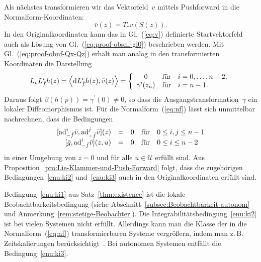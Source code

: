 \begin{svmultproof2}
Als nächstes transformieren wir das Vektorfeld~$v$ mittels Pushforward
in die Normalform-Koordinaten: 
\[
\bar{v}(z)=T_{*}v(S(z)).
\]
In den Originalkoordinaten kann das in Gl.~(\ref{eq:v}) definierte
Startvektorfeld auch als Lösung von Gl.~(\ref{eq:proof-obsnf-gl0})
beschrieben werden. Mit Gl.~(\ref{eq:proof-obnf-Qx-Qz}) erhält man
analog in den transformierten Koordinaten die Darstellung 
\[
L_{\bar{v}}L_{\bar{f}}^{i}\bar{h}(z)=\left\langle {\mathrm{d}} L_{\bar{f}}^{i}\bar{h}(z),\bar{v}(z)\right\rangle =\left\{ \begin{array}{ccl}
0 & \mbox{für} & i=0,\ldots,n-2,\\
\gamma^{\prime}(z_{n}) & \mbox{für} & i=n-1.
\end{array}\right.
\]
Daraus folgt $\beta(h(p))=\gamma^{\prime}(0)\neq0$, so dass die Ausgangstransformation~$\gamma$
ein lokaler Diffeomorphismus ist. Für die Normalform~(\ref{eq:nf})
lässt sich unmittelbar nachrechnen, dass die Bedingungen 
\[
\begin{array}{rclcl}
[{\operatorname{ad}}_{-\bar{f}}^{i}\bar{v},{\operatorname{ad}}_{-\bar{f}}^{j}\bar{v}](z) & = & 0 & \mbox{für} & 0\leq i,j\leq n-1\\{}
[\bar{g},{\operatorname{ad}}_{-\bar{f}}^{i}\bar{v}](z,u) & = & 0 & \mbox{für} & 0\leq i\leq n-2
\end{array}
\]
in einer Umgebung von $z=0$ und für alle $u\in\mathcal{U}$ erfüllt
sind. Aus Proposition~\ref{pro:Lie-Klammer-und-Push-Forward} folgt,
dass die zugehörigen Bedingungen~\ref{enu:ki2} und~\ref{enu:ki3}
auch in den Originalkoordinaten erfüllt sind.
\end{svmultproof2}

Bedingung~\ref{enu:ki1} aus Satz~\ref{thm:existence} ist die lokale
Beobachtbarkeitsbedingung (siehe Abschnitt~\ref{subsec:Beobachtbarkeit-autonom}
und Anmerkung~\ref{rem:stetige-Beobachter}). Die Integrabilitätsbedingung~\ref{enu:ki2}
ist bei vielen Systemen nicht erfüllt. Allerdings kann man die Klasse
der in die Normalform~(\ref{eq:nf}) transformierbaren Systeme vergrößern,
indem man z.\,B. Zeitskalierungen berücksichtigt~\cite{guay2002,respondek2004}\@.
Bei autonomen Systemen entfällt die Bedingung~\ref{enu:ki3}. 

